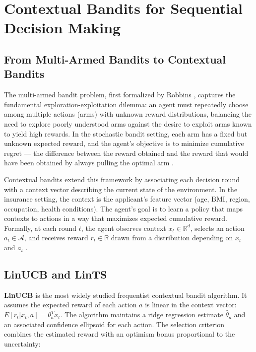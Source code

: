 \section{Contextual Bandits for Sequential Decision Making}\label{contextual-bandits-for-sequential-decision-making}

\subsection{From Multi-Armed Bandits to Contextual Bandits}\label{from-multi-armed-bandits-to-contextual-bandits}

The multi-armed bandit problem, first formalized by Robbins \citeyearpar{Robbins1952}, captures the fundamental exploration-exploitation dilemma: an agent must repeatedly choose among multiple actions (arms) with unknown reward distributions, balancing the need to explore poorly understood arms against the desire to exploit arms known to yield high rewards. In the stochastic bandit setting, each arm has a fixed but unknown expected reward, and the agent's objective is to minimize cumulative regret --- the difference between the reward obtained and the reward that would have been obtained by always pulling the optimal arm \citep{Robbins1952, Lattimore2020}.

Contextual bandits extend this framework by associating each decision round with a context vector describing the current state of the environment. In the insurance setting, the context is the applicant's feature vector (age, BMI, region, occupation, health conditions). The agent's goal is to learn a policy that maps contexts to actions in a way that maximizes expected cumulative reward. Formally, at each round \(t\), the agent observes context \(x_t \in \mathbb{R}^d\), selects an action \(a_t \in \mathcal{A}\), and receives reward \(r_t \in \mathbb{R}\) drawn from a distribution depending on \(x_t\) and \(a_t\) \citep{Li2010}.

\subsection{LinUCB and LinTS}\label{linucb-and-lints}

\textbf{LinUCB} \citep{Li2010} is the most widely studied frequentist contextual bandit algorithm. It assumes the expected reward of each action \(a\) is linear in the context vector: \(E[r_t | x_t, a] = \theta_a^T x_t\). The algorithm maintains a ridge regression estimate \(\hat{\theta}_a\) and an associated confidence ellipsoid for each action. The selection criterion combines the estimated reward with an optimism bonus proportional to the uncertainty:

